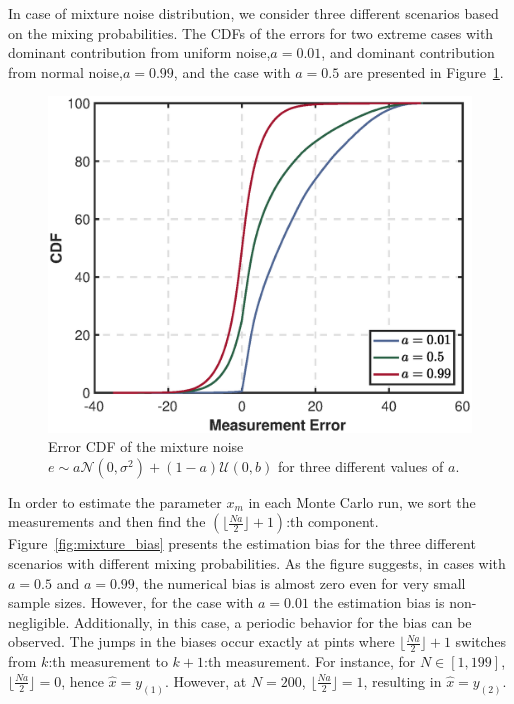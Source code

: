\documentclass[journal]{IEEEtran}
\begin{document}
In case of mixture noise distribution, we consider three different scenarios based on the mixing probabilities. The CDFs of the errors for two extreme cases with dominant contribution from uniform noise,$a=0.01$, and dominant contribution from normal noise,$a=0.99$, and the case with $a=0.5$ are presented in Figure~\ref{fig:mixture_cdf}. 
%
%
\begin{figure}[!t] 
	\centering
	\includegraphics[width=\columnwidth]{cdf_mixture}
	\caption{Error CDF of the mixture noise $e\sim a\mathcal{N}(0,\sigma^2) + (1-a)\mathcal{U}(0,b)$ for three different values of $a$.}		
	\label{fig:mixture_cdf}
\end{figure}
%
%

In order to estimate the parameter $x_m$ in each Monte Carlo run, we sort the measurements and then find the $(\lfloor\frac{Na}{2}\rfloor+1)$:th component. Figure~\ref{fig:mixture_bias} presents the estimation bias for the three different scenarios with different mixing probabilities. As the figure suggests, in cases with $a=0.5$ and $a=0.99$, the numerical bias is almost zero even for very small sample sizes. However, for the case with $a=0.01$ the estimation bias is non-negligible. Additionally, in this case, a periodic behavior for the bias can be observed. The jumps in the biases occur exactly at pints where $\lfloor\frac{Na}{2}\rfloor+1$ switches from $k$:th measurement to $k+1$:th measurement. For instance, for $N\in[1,199]$, $\lfloor\frac{Na}{2}\rfloor=0$, hence $\hat{x}=y_{(1)}$. However, at $N=200$, $\lfloor\frac{Na}{2}\rfloor=1$, resulting in $\hat{x}=y_{(2)}$.
\end{document}
